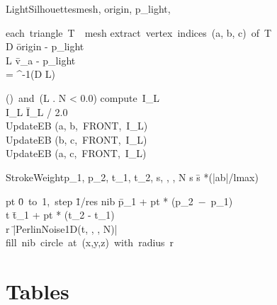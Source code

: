 \documentclass[accepted,single]{gipaper}
\begin{document}
\vspace{0.15cm}


\begin{algorithm}{LightSilhouettes}{mesh, origin, p_{light}, \theta}
\begin{FOR}{each~triangle~T~\in~mesh}
extract~vertex~indices~(a, b, c)~of~T \\
D \= origin - p_{light} \\
L \= v_{a} - p_{light} \\
\gamma = \cos^{-1}(D \cdot L) \\
\begin{IF}{(\gamma \leq \theta)~and~(L . N < 0.0)}
      compute~I_{L} \\
      I_{L} \= I_{L} / 2.0\\
      UpdateEB (a, b,~FRONT,~I_{L})\\
      UpdateEB (b, c,~FRONT,~I_{L})\\
      UpdateEB (a, c,~FRONT,~I_{L})
\end{IF}
\end{FOR}
\end{algorithm}

\vspace{0.15cm}


\begin{algorithm}{StrokeWeight}{p_{1}, p_{2}, t_{1}, t_{2}, s, \alpha, \beta, N}
s \= s *(|ab|/lmax)\\
\begin{FOR}{pt \= 0~to~1,~step \= 1/res}
nib \= p_{1} + pt * (p_{2}~$-$~p_{1}) \\
t \= t_{1} + pt * (t_{2} - t_{1}) \\
r \= |PerlinNoise1D(t, \alpha, \beta, N)| \\
fill~nib~circle~at~(x,y,z)~with~radius~r
\end{FOR}
\end{algorithm}



\section{Tables}
\label{tables}
\end{document}
